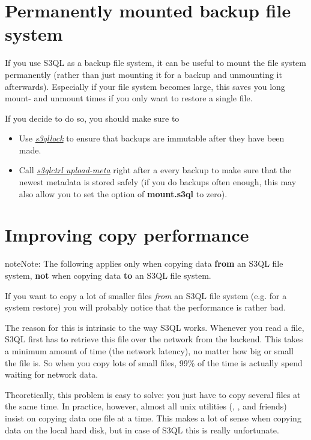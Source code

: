 \documentclass[letterpaper,10pt,english]{sphinxmanual}
\begin{document}
\section{Permanently mounted backup file system}
\label{tips:permanently-mounted-backup-file-system}
If you use S3QL as a backup file system, it can be useful to mount the
file system permanently (rather than just mounting it for a backup and
unmounting it afterwards). Especially if your file system becomes
large, this saves you long mount- and unmount times if you only want
to restore a single file.

If you decide to do so, you should make sure to
\begin{itemize}
\item {} 
Use {\hyperref[special:s3qllock]{\emph{s3qllock}}} to ensure that backups are immutable
after they have been made.

\item {} 
Call {\hyperref[special:s3qlctrl]{\emph{s3qlctrl upload-meta}}} right after a every
backup to make sure that the newest metadata is stored safely (if
you do backups often enough, this may also allow you to set the
 option of \textbf{mount.s3ql}
to zero).

\end{itemize}


\section{Improving copy performance}
\label{tips:copy-performance}\label{tips:improving-copy-performance}
\begin{notice}{note}{Note:}
The following applies only when copying data \textbf{from} an S3QL file
system, \textbf{not} when copying data \textbf{to} an S3QL file system.
\end{notice}

If you want to copy a lot of smaller files \emph{from} an S3QL file system
(e.g. for a system restore) you will probably notice that the
performance is rather bad.

The reason for this is intrinsic to the way S3QL works. Whenever you
read a file, S3QL first has to retrieve this file over the network
from the backend. This takes a minimum amount of time (the network
latency), no matter how big or small the file is. So when you copy
lots of small files, 99\% of the time is actually spend waiting for
network data.

Theoretically, this problem is easy to solve: you just have to copy
several files at the same time. In practice, however, almost all unix
utilities (, ,  and friends) insist on copying
data one file at a time. This makes a lot of sense when copying data
on the local hard disk, but in case of S3QL this is really
unfortunate.
\end{document}
